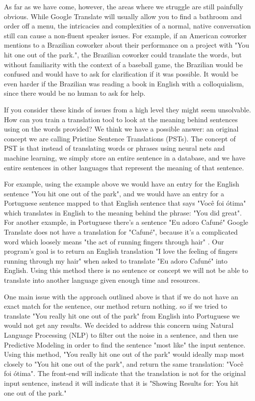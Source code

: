 \documentclass[runningheads]{llncs}
\begin{document}
	As far as we have come, however, the areas where we struggle are still painfully obvious. While Google Translate will usually allow you to find a bathroom and order off a menu, the intricacies and complexities of a normal, native conversation still can cause a non-fluent speaker issues. For example, if an American coworker mentions to a Brazilian coworker about their performance on a project with "You hit one out of the park.", the Brazilian coworker could translate the words, but without familiarity with the context of a baseball game, the Brazilian would be confused and would have to ask for clarification if it was possible. It would be even harder if the Brazilian was reading a book in English with a colloquialism, since there would be no human to ask for help.
	
	If you consider these kinds of issues from a high level they might seem unsolvable. How can you train a translation tool to look at the meaning behind sentences using on the words provided? We think we have a possible answer: an original concept we are calling Pristine Sentence Translations (PSTs). The concept of PST is that instead of translating words or phrases using neural nets and machine learning, we simply store an entire sentence in a database, and we have entire sentences in other languages that represent the meaning of that sentence. 
	
	For example, using the example above we would have an entry for the English sentence "You hit one out of the park", and we would have an entry for a Portuguese sentence mapped to that English sentence that says "Você foi ótima" which translates in English to the meaning behind the phrase: "You did great". For another example, in Portuguese there's a sentence "Eu adoro Cafuné" Google Translate does not have a translation for "Cafuné", because it's a complicated word which loosely means "the act of running fingers through hair" . Our program's goal is to return an English translation "I love the feeling of fingers running through my hair" when asked to translate "Eu adoro Cafuné" into English. Using this method there is no sentence or concept we will not be able to translate into another language given enough time and resources.
	
	One main issue with the approach outlined above is that if we do not have an exact match for the sentence, our method return nothing. so if we tried to translate "You really hit one out of the park" from English into Portuguese we would not get any results. We decided to address this concern using Natural Language Processing (NLP) to filter out the noise in a sentence, and then use Predictive Modeling in order to find the sentence "most like" the input sentence. Using this method, "You really hit one out of the park" would ideally map most closely to "You hit one out of the park", and return the same translation: "Você foi ótima". The front-end will indicate that the translation is not for the original input sentence, instead it will indicate that it is "Showing Results for: You hit one out of the park."
	
\end{document}
